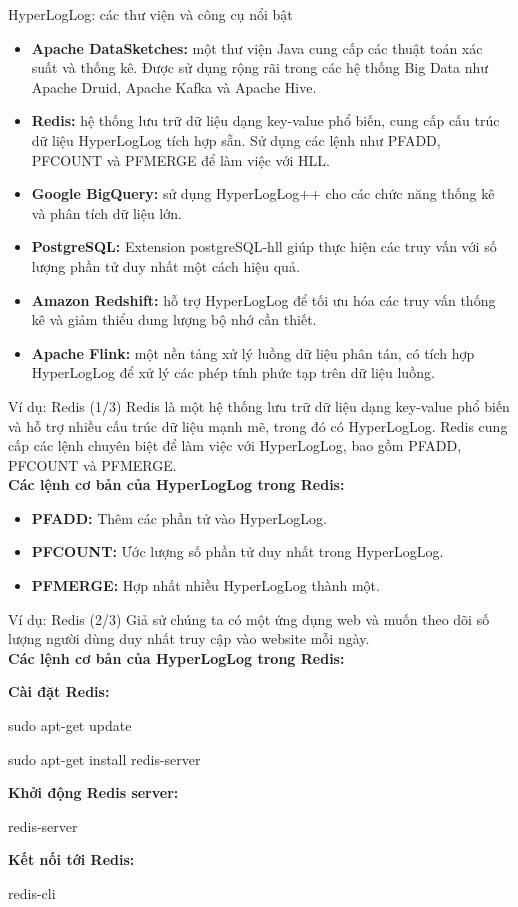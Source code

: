 \documentclass[10pt]{beamer}
\newcommand{\SubItem}[1]{
    {\setlength\itemindent{15pt} \item[-] #1}
}
\begin{document}
\begin{frame}{HyperLogLog: các thư viện và công cụ nổi bật }
  \begin{itemize}
    \item \textbf{Apache DataSketches:} một thư viện Java cung cấp các thuật toán xác suất và thống kê. Được sử dụng rộng rãi trong các hệ thống Big Data như 
    Apache Druid, Apache Kafka và Apache Hive.
    \item \textbf{Redis:} hệ thống lưu trữ dữ liệu dạng key-value phổ biến, cung cấp 
    cấu trúc dữ liệu HyperLogLog tích hợp sẵn. Sử dụng các lệnh như PFADD, PFCOUNT 
    và PFMERGE để làm việc với HLL.
    \item \textbf{Google BigQuery:} sử dụng HyperLogLog++ cho các chức năng thống kê và phân tích dữ liệu lớn.
    \item \textbf{PostgreSQL:} Extension postgreSQL-hll giúp thực hiện các truy vấn với số lượng phần tử duy nhất một cách hiệu quả.
    \item \textbf{Amazon Redshift:} hỗ trợ HyperLogLog để tối ưu hóa các truy vấn thống kê và giảm thiểu dung lượng bộ nhớ cần thiết.
    \item \textbf{Apache Flink:} một nền tảng xử lý luồng dữ liệu phân tán, 
    có tích hợp HyperLogLog để xử lý các phép tính phức tạp trên dữ liệu luồng.
  \end{itemize}
\end{frame}

\begin{frame}{Ví dụ: Redis (1/3)}
Redis là một hệ thống lưu trữ dữ liệu dạng key-value phổ biến và hỗ trợ nhiều cấu trúc dữ liệu mạnh mẽ, trong đó có HyperLogLog. Redis cung cấp các lệnh chuyên biệt để làm việc với HyperLogLog, bao gồm PFADD, PFCOUNT và PFMERGE.\\
\textbf{Các lệnh cơ bản của HyperLogLog trong Redis:}
  \begin{itemize}
    \item \textbf{PFADD:} Thêm các phần tử vào HyperLogLog.
    \item \textbf{PFCOUNT:} Ước lượng số phần tử duy nhất trong HyperLogLog.
    \item \textbf{PFMERGE:} Hợp nhất nhiều HyperLogLog thành một.
  \end{itemize}
\end{frame}

\begin{frame}{Ví dụ: Redis (2/3)}
Giả sử chúng ta có một ứng dụng web và muốn theo dõi số lượng người dùng duy nhất truy cập vào website mỗi ngày.\\
\textbf{Các lệnh cơ bản của HyperLogLog trong Redis:}
  \begin{itemize}
    \item \textbf{Cài đặt Redis:} 
   	\SubItem{sudo apt-get update}
   	\SubItem{sudo apt-get install redis-server}
    \item \textbf{Khởi động Redis server:} 
    \SubItem{redis-server}   
    \item \textbf{Kết nối tới Redis:}
    \SubItem{redis-cli}
   \end{itemize}
\end{frame}
\end{document}
